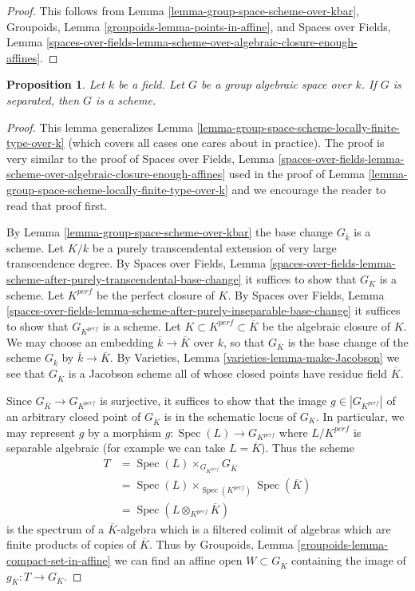 \documentclass{stacks-project}
\theoremstyle{plain}
\newtheorem{proposition}[subsection]{Proposition}
\theoremstyle{definition}
\theoremstyle{remark}
\numberwithin{equation}{subsection}
\def\Spec{\mathop{\mathrm{Spec}}}
\begin{document}
\begin{proof}
This follows from
Lemma \ref{lemma-group-space-scheme-over-kbar},
Groupoids, Lemma \ref{groupoids-lemma-points-in-affine}, and
Spaces over Fields, Lemma
\ref{spaces-over-fields-lemma-scheme-over-algebraic-closure-enough-affines}.
\end{proof}

\begin{proposition}
\label{proposition-group-space-scheme-over-field}
Let $k$ be a field. Let $G$ be a group algebraic space over $k$.
If $G$ is separated, then $G$ is a scheme.
\end{proposition}

\begin{proof}
This lemma generalizes
Lemma \ref{lemma-group-space-scheme-locally-finite-type-over-k}
(which covers all cases one cares about in practice).
The proof is very similar to the proof of
Spaces over Fields, Lemma
\ref{spaces-over-fields-lemma-scheme-over-algebraic-closure-enough-affines}
used in the proof of
Lemma \ref{lemma-group-space-scheme-locally-finite-type-over-k}
and we encourage the reader to read that proof first.

\medskip\noindent
By Lemma \ref{lemma-group-space-scheme-over-kbar} the base
change $G_{\overline{k}}$ is a scheme.
Let $K/k$ be a purely transcendental extension of very large
transcendence degree. By Spaces over Fields, Lemma
\ref{spaces-over-fields-lemma-scheme-after-purely-transcendental-base-change}
it suffices to show that $G_K$ is a scheme.
Let $K^{perf}$ be the perfect closure of $K$. By
Spaces over Fields, Lemma
\ref{spaces-over-fields-lemma-scheme-after-purely-inseparable-base-change}
it suffices to show that $G_{K^{perf}}$ is a scheme.
Let $K \subset K^{perf} \subset \overline{K}$ be the algebraic closure
of $K$. We may choose an embedding $\overline{k} \to \overline{K}$ over
$k$, so that $G_{\overline{K}}$ is the base change of the scheme
$G_{\overline{k}}$ by $\overline{k} \to \overline{K}$. By
Varieties, Lemma \ref{varieties-lemma-make-Jacobson}
we see that $G_{\overline{K}}$ is a Jacobson scheme all of whose
closed points have residue field $\overline{K}$.

\medskip\noindent
Since $G_{\overline{K}} \to G_{K^{perf}}$ is surjective, it suffices to
show that the image $g \in |G_{K^{perf}}|$ of an arbitrary closed point of
$G_{\overline{K}}$ is in the schematic locus of $G_K$.
In particular, we may represent $g$ by a morphism
$g : \Spec(L) \to G_{K^{perf}}$ where $L/K^{perf}$ is separable algebraic
(for example we can take $L = \overline{K}$). Thus the scheme
\begin{align*}
T & = \Spec(L) \times_{G_{K^{perf}}} G_{\overline{K}} \\
& =
\Spec(L) \times_{\Spec(K^{perf})} \Spec(\overline{K}) \\
& =
\Spec(L \otimes_{K^{perf}} \overline{K})
\end{align*}
is the spectrum of a $\overline{K}$-algebra which is a filtered colimit
of algebras which are finite products of copies of $\overline{K}$.
Thus by Groupoids, Lemma \ref{groupoids-lemma-compact-set-in-affine}
we can find an affine open $W \subset G_{\overline{K}}$ containing
the image of $g_{\overline{K}} : T \to G_{\overline{K}}$.


\end{proof}
\end{document}
